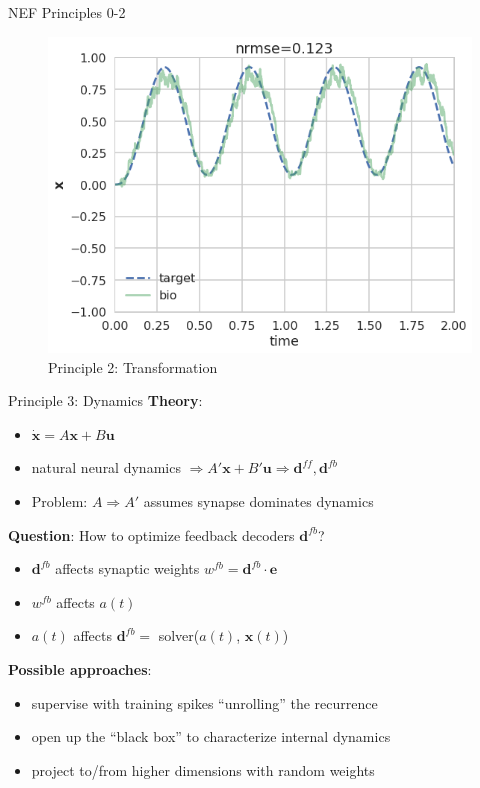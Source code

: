 \documentclass[aspectratio=169]{beamer}
\begin{document}
\begin{frame}{NEF Principles 0-2}
{\begin{figure}
    \includegraphics[height=0.8\textheight]{media/pre_fx_decode.png}
    \caption{Principle 2: Transformation}
    \label{transformation}
    \end{figure}}
\end{frame}

\begin{frame}{Principle 3: Dynamics}
	\textbf{Theory}:
    \begin{itemize}
      \item $\dot{\mathbf{x}} = A\mathbf{x} + B\mathbf{u}$
      \item natural neural dynamics $\Rightarrow A'\mathbf{x} + B'\mathbf{u} \Rightarrow \mathbf{d}^{ff}, \mathbf{d}^{fb}$
      \item Problem: $A \Rightarrow A'$ assumes synapse dominates dynamics
    \end{itemize}
  \vspace{0.5cm}
  \pause
  \textbf{Question}: How to optimize feedback decoders $\mathbf{d}^{fb}$?
  \begin{itemize}
    \item $\mathbf{d}^{fb}$ affects synaptic weights $w^{fb} = \mathbf{d}^{fb} \cdot \mathbf{e}$
    \item $w^{fb}$ affects $a(t)$
    \item $a(t)$ affects $\mathbf{d}^{fb}=$ solver($a(t)$, $\mathbf{x}(t)$)
  \end{itemize}
  \vspace{0.5cm}
  \pause
  \textbf{Possible approaches}:
  \begin{itemize}
    \item supervise with training spikes ``unrolling'' the recurrence
    \item open up the ``black box'' to characterize internal dynamics
    \item project to/from higher dimensions with random weights
  \end{itemize}
\end{frame}
\end{document}
